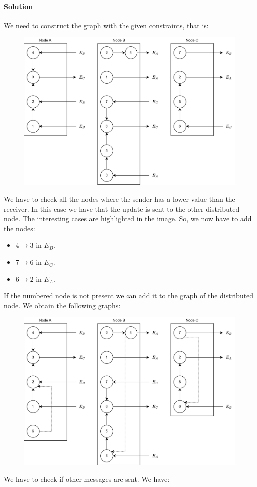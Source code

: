 \paragraph*{Solution}
We need to construct the graph with the given constraints, that is: 
\begin{figure}[H]
    \centering
    \includegraphics[width=0.6\linewidth]{images/Ob1.png}
\end{figure}
We have to check all the nodes where the sender has a lower value than the receiver. In this case we have that the update is sent to the 
other distributed node. The interesting cases are highlighted in the image. So, we now have to add the nodes: 
\begin{itemize}
    \item $4 \rightarrow 3$ in $E_B$. 
    \item $7 \rightarrow 6$ in $E_C$. 
    \item $6 \rightarrow 2$ in $E_A$. 
\end{itemize}
If the numbered node is not present we can add it to the graph of the distributed node. We obtain the following graphs: 
\begin{figure}[H]
    \centering
    \includegraphics[width=0.75\linewidth]{images/Ob2.png}
\end{figure}
We have to check if other messages are sent. We have:
